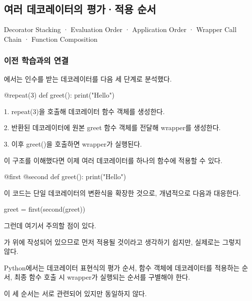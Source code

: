 

\subsection{여러 데코레이터의 평가·적용 순서}

Decorator Stacking · Evaluation Order · Application Order · Wrapper Call Chain · Function Composition

\subsubsection{이전 학습과의 연결}

에서는 인수를 받는 데코레이터를 다음 세 단계로 분석했다.

\begin{dhkcode}
@repeat(3)
def greet():
    print("Hello")
\end{dhkcode}

\begin{dhksmry}
1. repeat(3)을 호출해 데코레이터 함수 객체를 생성한다.

2. 반환된 데코레이터에 원본 greet 함수 객체를 전달해 wrapper를 생성한다.

3. 이후 greet()을 호출하면 wrapper가 실행된다.
\end{dhksmry}

이 구조를 이해했다면 이제 여러 데코레이터를 하나의 함수에 적용할 수 있다.

\begin{dhkcode}
@first
@second
def greet():
    print("Hello")
\end{dhkcode}

이 코드는 단일 데코레이터의 변환식을 확장한 것으로, 개념적으로 다음과 대응한다.

\begin{dhkcode}
greet = first(second(greet))
\end{dhkcode}

그런데 여기서 주의할 점이 있다.

가 위에 작성되어 있으므로 먼저 적용될 것이라고 생각하기 쉽지만, 실제로는 그렇지 않다.

Python에서는 데코레이터 표현식의 평가 순서, 함수 객체에 데코레이터를 적용하는 순서, 최종 함수 호출 시 wrapper가 실행되는 순서를 구별해야 한다.

이 세 순서는 서로 관련되어 있지만 동일하지 않다.

